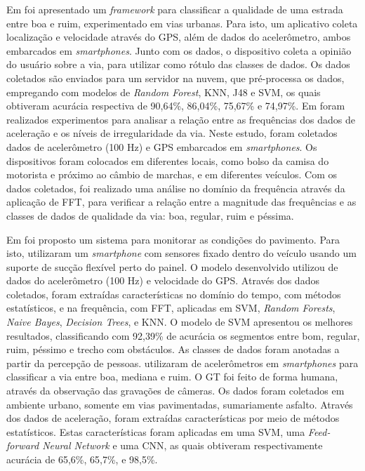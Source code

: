 Em  foi apresentado um \textit{framework} para classificar a qualidade de uma estrada entre boa e ruim, experimentado em vias urbanas. Para isto, um aplicativo coleta localização e velocidade através do GPS, além de dados do acelerômetro, ambos embarcados em \textit{smartphones}. Junto com os dados, o dispositivo coleta a opinião do usuário sobre a via, para utilizar como rótulo das classes de dados. Os dados coletados são enviados para um servidor na nuvem, que pré-processa os dados, empregando com modelos de \textit{Random Forest}, KNN, J48 e SVM, os quais obtiveram acurácia respectiva de 90,64\%, 86,04\%, 75,67\% e 74,97\%. Em  foram realizados experimentos para analisar a relação entre as frequências dos dados de aceleração e os níveis de irregularidade da via. Neste estudo, foram coletados dados de acelerômetro (100 Hz) e GPS embarcados em \textit{smartphones}. Os dispositivos foram colocados em diferentes locais, como bolso da camisa do motorista e próximo ao câmbio de marchas, e em diferentes veículos. Com os dados coletados, foi realizado uma análise no domínio da frequência através da aplicação de FFT, para verificar a relação entre a magnitude das frequências e as classes de dados de qualidade da via: boa, regular, ruim e péssima.

Em  foi proposto um sistema para monitorar as condições do pavimento. Para isto, utilizaram um \textit{smartphone} com sensores fixado dentro do veículo usando um suporte de sucção flexível perto do painel. O modelo desenvolvido utilizou de dados do acelerômetro (100 Hz) e velocidade do GPS. Através dos dados coletados, foram extraídas características no domínio do tempo, com métodos estatísticos, e na frequência, com FFT, aplicadas em SVM, \textit{Random Forests}, \textit{Naive Bayes}, \textit{Decision Trees}, e KNN. O modelo de SVM apresentou os melhores resultados, classificando com 92,39\% de acurácia os segmentos entre bom, regular, ruim, péssimo e trecho com obstáculos. As classes de dados foram anotadas a partir da percepção de pessoas.  utilizaram de acelerômetros em \textit{smartphones} para classificar a via entre boa, mediana e ruim. O GT foi feito de forma humana, através da observação das gravações de câmeras. Os dados foram coletados em ambiente urbano, somente em vias pavimentadas, sumariamente asfalto. Através dos dados de aceleração, foram extraídas características por meio de métodos estatísticos. Estas características foram aplicadas em uma SVM, uma \textit{Feed-forward Neural Network} e uma CNN, as quais obtiveram respectivamente acurácia de 65,6\%, 65,7\%, e 98,5\%.

